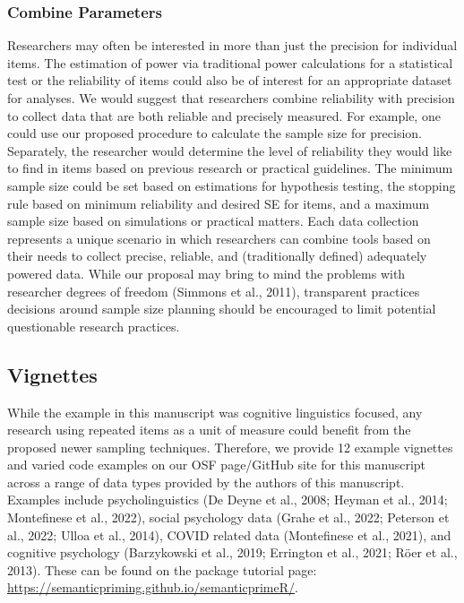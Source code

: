 \documentclass[
  man]{apa7}
\begin{document}
\subsubsection{Combine Parameters}\label{combine-parameters}

Researchers may often be interested in more than just the precision for individual items. The estimation of power via traditional power calculations for a statistical test or the reliability of items could also be of interest for an appropriate dataset for analyses. We would suggest that researchers combine reliability with precision to collect data that are both reliable and precisely measured. For example, one could use our proposed procedure to calculate the sample size for precision. Separately, the researcher would determine the level of reliability they would like to find in items based on previous research or practical guidelines. The minimum sample size could be set based on estimations for hypothesis testing, the stopping rule based on minimum reliability and desired SE for items, and a maximum sample size based on simulations or practical matters. Each data collection represents a unique scenario in which researchers can combine tools based on their needs to collect precise, reliable, and (traditionally defined) adequately powered data. While our proposal may bring to mind the problems with researcher degrees of freedom (Simmons et al., 2011), transparent practices decisions around sample size planning should be encouraged to limit potential questionable research practices.

\subsection{Vignettes}\label{vignettes}

While the example in this manuscript was cognitive linguistics focused, any research using repeated items as a unit of measure could benefit from the proposed newer sampling techniques. Therefore, we provide 12 example vignettes and varied code examples on our OSF page/GitHub site for this manuscript across a range of data types provided by the authors of this manuscript. Examples include psycholinguistics (De Deyne et al., 2008; Heyman et al., 2014; Montefinese et al., 2022), social psychology data (Grahe et al., 2022; Peterson et al., 2022; Ulloa et al., 2014), COVID related data (Montefinese et al., 2021), and cognitive psychology (Barzykowski et al., 2019; Errington et al., 2021; Röer et al., 2013). These can be found on the package tutorial page: \url{https://semanticpriming.github.io/semanticprimeR/}.
\end{document}
